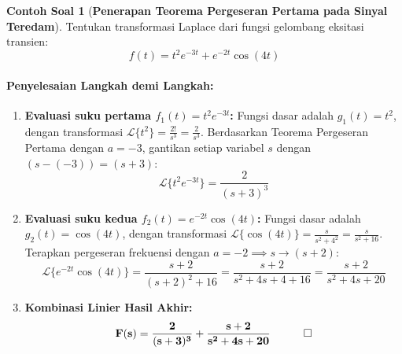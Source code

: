 \documentclass[11pt,a4paper]{article}
\theoremstyle{definition}
\newtheorem{example}{Contoh Soal}[section]
\begin{document}
\begin{example}[\textbf{Penerapan Teorema Pergeseran Pertama pada Sinyal Teredam}]
Tentukan transformasi Laplace dari fungsi gelombang eksitasi transien:
\begin{equation*}
    f(t) = t^2 e^{-3t} + e^{-2t} \cos(4t)
\end{equation*}

\paragraph{Penyelesaian Langkah demi Langkah:}
\begin{enumerate}[leftmargin=*]
    \item \textbf{Evaluasi suku pertama $f_1(t) = t^2 e^{-3t}$:}
    Fungsi dasar adalah $g_1(t) = t^2$, dengan transformasi $\mathcal{L}\{t^2\} = \frac{2!}{s^3} = \frac{2}{s^3}$.
    Berdasarkan Teorema Pergeseran Pertama dengan $a = -3$, gantikan setiap variabel $s$ dengan $(s - (-3)) = (s + 3)$:
    \begin{equation*}
        \mathcal{L}\{t^2 e^{-3t}\} = \frac{2}{(s + 3)^3}
    \end{equation*}

    \item \textbf{Evaluasi suku kedua $f_2(t) = e^{-2t} \cos(4t)$:}
    Fungsi dasar adalah $g_2(t) = \cos(4t)$, dengan transformasi $\mathcal{L}\{\cos(4t)\} = \frac{s}{s^2 + 4^2} = \frac{s}{s^2 + 16}$.
    Terapkan pergeseran frekuensi dengan $a = -2 \implies s \to (s + 2)$:
    \begin{equation*}
        \mathcal{L}\{e^{-2t} \cos(4t)\} = \frac{s + 2}{(s + 2)^2 + 16} = \frac{s + 2}{s^2 + 4s + 4 + 16} = \frac{s + 2}{s^2 + 4s + 20}
    \end{equation*}

    \item \textbf{Kombinasi Linier Hasil Akhir:}
    \begin{equation*}
        \mathbf{F(s) = \frac{2}{(s + 3)^3} + \frac{s + 2}{s^2 + 4s + 20}} \quad \qed
    \end{equation*}
\end{enumerate}
\end{example}
\end{document}
